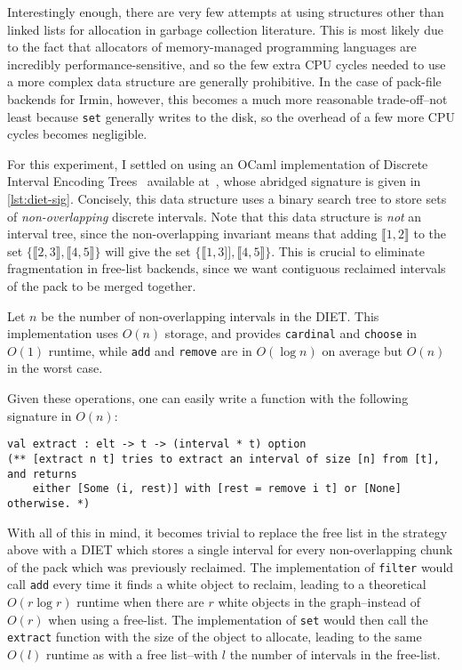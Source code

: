 Interestingly enough, there are very few attempts at using structures other than linked lists for allocation in garbage collection literature. This is most likely due to the fact that allocators of memory-managed programming languages are incredibly performance-sensitive, and so the few extra CPU cycles needed to use a more complex data structure are generally prohibitive. In the case of pack-file backends for Irmin, however, this becomes a much more reasonable trade-off--not least because \texttt{set} generally writes to the disk, so the overhead of a few more CPU cycles becomes negligible.

\bigskip
For this experiment, I settled on using an OCaml implementation of Discrete Interval Encoding Trees~\cite{erwig89} available at~\cite{diet-github}, whose abridged signature is given in \cref{lst:diet-sig}. Concisely, this data structure uses a binary search tree to store sets of \emph{non-overlapping} discrete intervals. Note that this data structure is \emph{not} an interval tree, since the non-overlapping invariant means that adding \(\llbracket 1, 2 \rrbracket\) to the set \(\{\llbracket2, 3\rrbracket, \llbracket4, 5\rrbracket\}\) will give the set \(\{\llbracket1, 3]], \llbracket4, 5\rrbracket\}\). This is crucial to eliminate fragmentation in free-list backends, since we want contiguous reclaimed intervals of the pack to be merged together.



Let \(n\) be the number of non-overlapping intervals in the DIET. This implementation uses \(O(n)\) storage, and provides \texttt{cardinal} and \texttt{choose} in \(O(1)\) runtime, while \texttt{add} and \texttt{remove} are in \(O(\log{n})\) on average but \(O(n)\) in the worst case.

Given these operations, one can easily write a function with the following signature in \(O(n)\):

\begin{verbatim}
val extract : elt -> t -> (interval * t) option
(** [extract n t] tries to extract an interval of size [n] from [t], and returns
    either [Some (i, rest)] with [rest = remove i t] or [None] otherwise. *)
\end{verbatim}

\newpage
With all of this in mind, it becomes trivial to replace the free list in the strategy above with a DIET which stores a single interval for every non-overlapping chunk of the pack which was previously reclaimed. The implementation of \texttt{filter} would call \texttt{add} every time it finds a white object to reclaim, leading to a theoretical \(O(r \log{r})\) runtime when there are \(r\) white objects in the graph--instead of \(O(r)\) when using a free-list. The implementation of \texttt{set} would then call the \texttt{extract} function with the size of the object to allocate, leading to the same \(O(l)\) runtime as with a free list--with \(l\) the number of intervals in the free-list.

